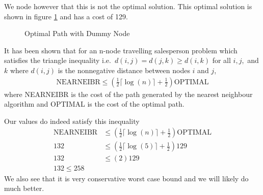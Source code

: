 We node however that this is not the optimal solution. This optimal solution is shown in 
figure \ref{fig:optDummy} and has a cost of 129.

\begin{figure}
\centering
{}
\caption{Optimal Path with Dummy Node}
\label{fig:optDummy}
\end{figure}



It has been shown that for an n-node travelling salesperson problem which satisfies the triangle inequality i.e.\ $d(i,j) = d(j,k) \geq d(i,k)$ for all $i,j,$ and $k$ where $d(i,j)$ is the nonnegative distance between nodes $i$ and $j$, 
\begin{align*}
\text{NEARNEIBR} \leq (\frac{1}{2} \lceil \log(n) \rceil + \frac{1}{2})\text{OPTIMAL}
\end{align*}
where NEARNEIBR is the cost of the path generated by the nearest neighbour algorithm and OPTIMAL is the cost of the optimal path. 

Our values do indeed satisfy this inequality
\begin{align*}
\text{NEARNEIBR} &\leq (\frac{1}{2} \lceil \log(n) \rceil + \frac{1}{2})\text{OPTIMAL} \\
132 &\leq (\frac{1}{2} \lceil \log(5) \rceil + \frac{1}{2})129 \\
132 &\leq (2)129 \\
132 \leq 258 
\end{align*}
We also see that it is very conservative worst case bound and we will likely do much better.

